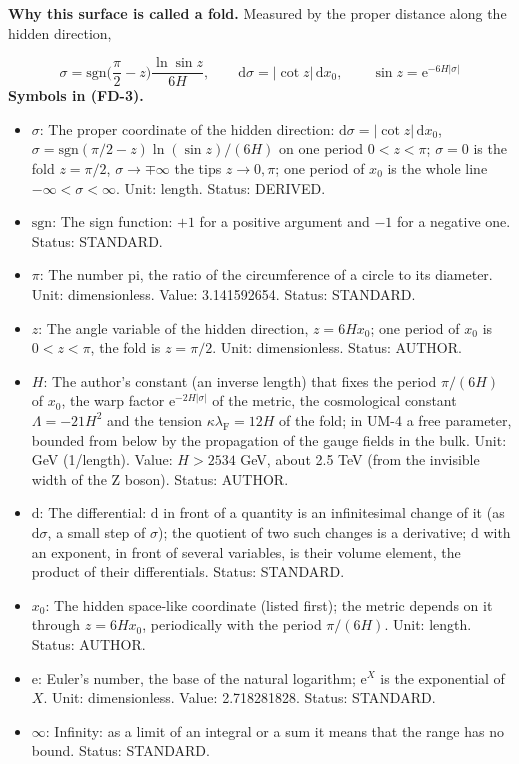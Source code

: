 \documentclass[
  10pt,
]{article}
\providecommand{\tightlist}{%
  \setlength{\itemsep}{0pt}\setlength{\parskip}{0pt}}
\begin{document}
\textbf{Why this surface is called a fold.} Measured by the proper
distance along the hidden direction,

\[
\sigma = \mathrm{sgn}\Big(\frac{\pi}{2} - z\Big)\frac{\ln\sin z}{6H},\qquad \mathrm{d}\sigma = \lvert\cot z\rvert\,\mathrm{d}x_0,\qquad
\sin z = \mathrm{e}^{-6H\lvert\sigma\rvert} \tag{FD-3}
\] \textbf{Symbols in (FD-3).}

\begin{itemize}
\tightlist
\item
  \(\sigma\): The proper coordinate of the hidden direction:
  \(\mathrm{d}\sigma = \lvert\cot z\rvert\,\mathrm{d}x_0\),
  \(\sigma = \mathrm{sgn}(\pi/2 - z)\ln(\sin z)/(6H)\) on one period
  \(0 < z < \pi\); \(\sigma = 0\) is the fold \(z = \pi/2\),
  \(\sigma \to \mp\infty\) the tips \(z \to 0, \pi\); one period of
  \(x_0\) is the whole line \(-\infty < \sigma < \infty\). Unit: length.
  Status: DERIVED.
\item
  \(\mathrm{sgn}\): The sign function: \(+1\) for a positive argument
  and \(-1\) for a negative one. Status: STANDARD.
\item
  \(\pi\): The number pi, the ratio of the circumference of a circle to
  its diameter. Unit: dimensionless. Value: 3.141592654. Status:
  STANDARD.
\item
  \(z\): The angle variable of the hidden direction, \(z = 6Hx_0\); one
  period of \(x_0\) is \(0 < z < \pi\), the fold is \(z = \pi/2\). Unit:
  dimensionless. Status: AUTHOR.
\item
  \(H\): The author's constant (an inverse length) that fixes the period
  \(\pi/(6H)\) of \(x_0\), the warp factor
  \(\mathrm{e}^{-2H\lvert\sigma\rvert}\) of the metric, the cosmological
  constant \(\Lambda = -21H^2\) and the tension
  \(\kappa\lambda_{\mathrm{F}} = 12H\) of the fold; in UM-4 a free
  parameter, bounded from below by the propagation of the gauge fields
  in the bulk. Unit: GeV (1/length). Value: \(H > 2534\) GeV, about 2.5
  TeV (from the invisible width of the Z boson). Status: AUTHOR.
\item
  \(\mathrm{d}\): The differential: \(\mathrm{d}\) in front of a
  quantity is an infinitesimal change of it (as \(\mathrm{d}\sigma\), a
  small step of \(\sigma\)); the quotient of two such changes is a
  derivative; \(\mathrm{d}\) with an exponent, in front of several
  variables, is their volume element, the product of their
  differentials. Status: STANDARD.
\item
  \(x_0\): The hidden space-like coordinate (listed first); the metric
  depends on it through \(z = 6Hx_0\), periodically with the period
  \(\pi/(6H)\). Unit: length. Status: AUTHOR.
\item
  \(\mathrm{e}\): Euler's number, the base of the natural logarithm;
  \(\mathrm{e}^{X}\) is the exponential of \(X\). Unit: dimensionless.
  Value: 2.718281828. Status: STANDARD.
\item
  \(\infty\): Infinity: as a limit of an integral or a sum it means that
  the range has no bound. Status: STANDARD.
\end{itemize}
\end{document}
